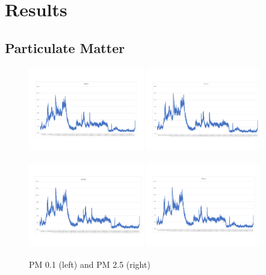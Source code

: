 
\chapter{Results}



\vspace{-2em}
\section{Particulate Matter}
\vspace{-2em}
\begin{figure}[!htb]
	\includegraphics[width=0.45\textwidth, height = 10em]{body/fig/PM0.1.pdf}%
	\includegraphics[width=0.45\textwidth, height = 10em]{body/fig/PM2.5.pdf}%
	\caption{PM 0.1 (left) and PM 2.5 (right)}
	\label{ACEM1}
	\includegraphics[width=0.45\textwidth, height = 10em]{body/fig/PM4.pdf}%
	\includegraphics[width=0.45\textwidth, height = 10em]{body/fig/PM10.pdf}%
	\label{ACEM2}
\end{figure}
